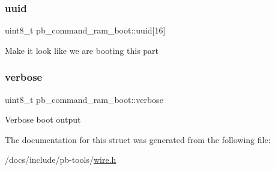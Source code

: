 \subsubsection{\texorpdfstring{uuid}{uuid}}
{\footnotesize\ttfamily uint8\+\_\+t pb\+\_\+command\+\_\+ram\+\_\+boot\+::uuid\mbox{[}16\mbox{]}}

Make it look like we are booting this part \mbox{\label{structpb__command__ram__boot_aca6546127ee7aedc307ceaa43e5889d1}} 
\subsubsection{\texorpdfstring{verbose}{verbose}}
{\footnotesize\ttfamily uint8\+\_\+t pb\+\_\+command\+\_\+ram\+\_\+boot\+::verbose}

Verbose boot output 

The documentation for this struct was generated from the following file\+:\begin{DoxyCompactItemize}
\item 
/docs/include/pb-\/tools/\hyperlink{wire_8h}{wire.\+h}\end{DoxyCompactItemize}
